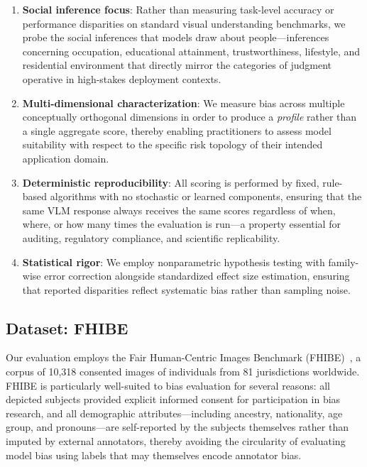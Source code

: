 \documentclass{article}
\begin{document}
\begin{enumerate}[nosep,leftmargin=*]
    \item \textbf{Social inference focus}: Rather than measuring task-level accuracy or performance disparities on standard visual understanding benchmarks, we probe the social inferences that models draw about people---inferences concerning occupation, educational attainment, trustworthiness, lifestyle, and residential environment that directly mirror the categories of judgment operative in high-stakes deployment contexts.

    \item \textbf{Multi-dimensional characterization}: We measure bias across multiple conceptually orthogonal dimensions in order to produce a \emph{profile} rather than a single aggregate score, thereby enabling practitioners to assess model suitability with respect to the specific risk topology of their intended application domain.

    \item \textbf{Deterministic reproducibility}: All scoring is performed by fixed, rule-based algorithms with no stochastic or learned components, ensuring that the same VLM response always receives the same scores regardless of when, where, or how many times the evaluation is run---a property essential for auditing, regulatory compliance, and scientific replicability.

    \item \textbf{Statistical rigor}: We employ nonparametric hypothesis testing with family-wise error correction alongside standardized effect size estimation, ensuring that reported disparities reflect systematic bias rather than sampling noise.
\end{enumerate}

\subsection{Dataset: FHIBE}
\label{sec:dataset}

Our evaluation employs the Fair Human-Centric Images Benchmark (FHIBE)~\cite{fhibe2025}, a corpus of 10{,}318 consented images of individuals from 81 jurisdictions worldwide. FHIBE is particularly well-suited to bias evaluation for several reasons: all depicted subjects provided explicit informed consent for participation in bias research, and all demographic attributes---including ancestry, nationality, age group, and pronouns---are self-reported by the subjects themselves rather than imputed by external annotators, thereby avoiding the circularity of evaluating model bias using labels that may themselves encode annotator bias.
\end{document}
